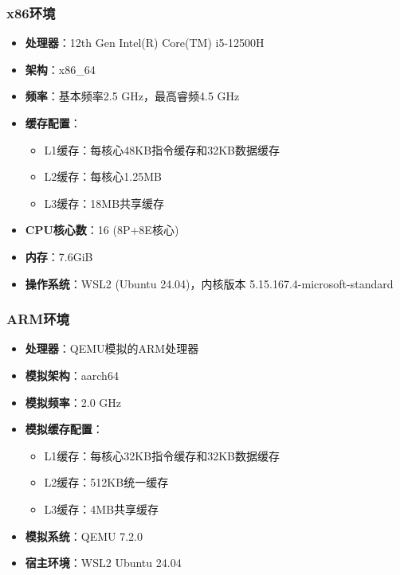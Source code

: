 \documentclass[a4paper,colorlinks=true,linkcolor=blue,urlcolor=blue,citecolor=green,bookmarks=true]{article}
\begin{document}
\subsubsection{x86环境}
\begin{itemize}
  \item \textbf{处理器}：12th Gen Intel(R) Core(TM) i5-12500H
  \item \textbf{架构}：x86\_64
  \item \textbf{频率}：基本频率2.5 GHz，最高睿频4.5 GHz
  \item \textbf{缓存配置}：
  \begin{itemize}
    \item L1缓存：每核心48KB指令缓存和32KB数据缓存
    \item L2缓存：每核心1.25MB
    \item L3缓存：18MB共享缓存
  \end{itemize}
  \item \textbf{CPU核心数}：16 (8P+8E核心)
  \item \textbf{内存}：7.6GiB
  \item \textbf{操作系统}：WSL2 (Ubuntu 24.04)，内核版本 5.15.167.4-microsoft-standard
\end{itemize}

\subsubsection{ARM环境}
\begin{itemize}
  \item \textbf{处理器}：QEMU模拟的ARM处理器
  \item \textbf{模拟架构}：aarch64
  \item \textbf{模拟频率}：2.0 GHz
  \item \textbf{模拟缓存配置}：
  \begin{itemize}
    \item L1缓存：每核心32KB指令缓存和32KB数据缓存
    \item L2缓存：512KB统一缓存
    \item L3缓存：4MB共享缓存
  \end{itemize}
  \item \textbf{模拟系统}：QEMU 7.2.0
  \item \textbf{宿主环境}：WSL2 Ubuntu 24.04
\end{itemize}
\end{document}
